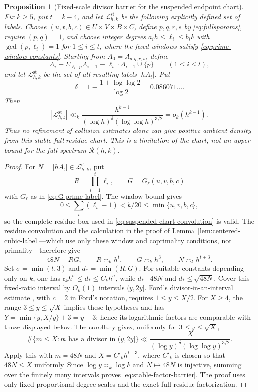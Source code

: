 \documentclass[11pt,reqno]{amsart}
\newtheorem{proposition}[theorem]{Proposition}
\theoremstyle{definition}
\theoremstyle{remark}
\newcommand{\Rcal}{\mathcal R}
\begin{document}
\begin{proposition}[Fixed-scale divisor barrier for the suspended endpoint chart]
\label{prop:stable-factor-barrier}
Fix $k\geq5$, put $t=k-4$, and let $\mathcal L^{\mathrm{st}}_{h,k}$ be the
following explicitly defined set of labels.  Choose
$(u,v,b,c)\in U\times V\times B\times C$, define $p,q,r,s$ by
\eqref{eq:fullsparams}, require $(p,q)=1$, and choose integer degrees
$a_i h\leq\ell_i\leq b_i h$ with $\gcd(p,\ell_i)=1$ for
$1\leq i\leq t$, where the fixed windows satisfy
\eqref{eq:prime-window-constants}.  Starting from
$A_0=A_{p,q,r,s}$, define
\begin{equation}\label{eq:stable-integer-suspension}
 A_i=\Sigma_{\ell_i,p}A_{i-1}
 =\ell_i\mathbin{\cdot}A_{i-1}\cup\{p\}
 \qquad(1\leq i\leq t),
\end{equation}
and let $\mathcal L^{\mathrm{st}}_{h,k}$ be the set of all resulting labels
$|hA_t|$.  Put
\[
 \delta=1-\frac{1+\log\log2}{\log2}=0.086071\ldots.
\]
Then
\begin{equation}\label{eq:stable-factor-barrier}
 |\mathcal L^{\mathrm{st}}_{h,k}|
 \ll_k
 \frac{h^{k-1}}
 {(\log h)^\delta(\log\log h)^{3/2}}
 =o_k(h^{k-1}).
\end{equation}
Thus no refinement of collision estimates alone can give positive ambient
density from this stable full-residue chart.  This is a limitation of the
chart, not an upper bound for the full spectrum $\Rcal(h,k)$.
\end{proposition}

\begin{proof}
For $N=|hA_t|\in\mathcal L^{\mathrm{st}}_{h,k}$, put
\[
 R=\prod_{i=1}^t\ell_i,
 \qquad G=G_{\boldsymbol\ell}(u,v,b,c)
\]
with $G_{\boldsymbol\ell}$ as in \eqref{eq:G-prime-label}.  The window bound
gives
\[
 0\leq\sum_i(\ell_i-1)<h/20\leq\min\{u,v,b,c\},
\]
so the complete residue box used in
\eqref{eq:suspended-chart-convolution} is valid.  The residue convolution and
the calculation in the proof of Lemma~\ref{lem:centered-cubic-label}---which
use only these window and coprimality conditions, not primality---therefore give
\[
 48N=R G,\qquad R\asymp_k h^t,\qquad G\asymp_k h^3,\qquad
 N\asymp_k h^{t+3}.
\]
Set $\sigma=\min(t,3)$ and $d_*=\min(R,G)$.  For suitable constants depending
only on $k$, one has $c_kh^\sigma\leq d_*\leq C_kh^\sigma$, while
$d_*\mid48N$ and $d_*\leq\sqrt{48N}$.  Cover this fixed-ratio interval by
$O_k(1)$ intervals $(y,2y]$.  Ford's divisor-in-an-interval estimate
\cite[Corollary~2]{Ford2008DivisorInterval}, with $c=2$ in Ford's notation, requires
$1\leq y\leq X/2$.  For $X\geq4$, the range $3\leq y\leq\sqrt X$ implies
these hypotheses and has $Y=\min\{y,X/y\}+3=y+3$; hence its logarithmic
factors are comparable with those displayed below.  The corollary gives,
uniformly for
$3\leq y\leq\sqrt X$,
\[
 \#\{m\leq X:m\text{ has a divisor in }(y,2y]\}
 \ll \frac{X}{(\log y)^\delta(\log\log y)^{3/2}}.
\]
Apply this with $m=48N$ and $X=C'_kh^{t+3}$, where $C'_k$ is chosen so
that $48N\leq X$ uniformly.  Since
$\log y\asymp_k\log h$ and $N\mapsto48N$ is injective, summing over the
finitely many intervals proves \eqref{eq:stable-factor-barrier}.
The proof uses only fixed proportional degree scales and the exact
full-residue factorization.
\end{proof}
\end{document}
